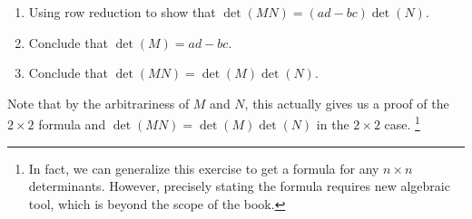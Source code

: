 \begin{exercises}
\begin{problist}
\begin{enumerate}
			\item Using row reduction to show that $\det(MN)=(ad-bc)\det(N)$.

			\item Conclude that $\det(M)=ad-bc$.

			\item Conclude that $\det(MN)=\det(M)\det(N)$.
		\end{enumerate}
		Note that by the arbitrariness of $M$ and $N$, this actually gives us a
		proof of the $2\times 2$ formula and $\det(MN)=\det(M)\det(N)$ in the
		$2\times 2$ case. \footnote{In fact, we can generalize this exercise to
		get a formula for any $n\times n$ determinants. However, precisely
		stating the formula requires new algebraic tool, which is beyond the scope
		of the book.}
	\end{problist}
\end{exercises} 
